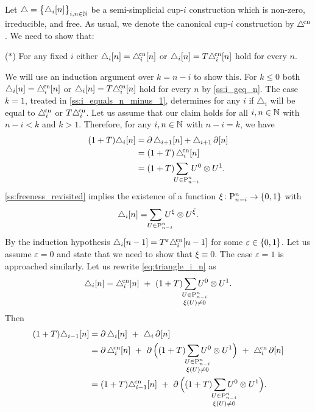 Let $\triangle = \set[\big]{\triangle_i [n]}_{i,n\in\N}$ be a semi-simplicial \mbox{cup-$i$} construction which is non-zero, irreducible, and free.
As usual, we denote the canonical \mbox{cup-$i$} construction by $\canonical$.
We need to show that:
\begin{center}
	($\ast$) For any fixed $i$ either $\triangle_i [n] = \canonical_ i [n]$ or $\triangle_i [n] = T\canonical_ i [n]$ hold for every $n$.
\end{center}
We will use an induction argument over $k = n-i$ to show this.
For $k \leq 0$ both $\triangle_i [n] = \canonical_ i [n]$ or $\triangle_i [n] = T\canonical_ i [n]$ hold for every $n$ by \cref{ss:i_geq_n}.
The case $k = 1$, treated in \cref{ss:i_equals_n_minus_1}, determines for any $i$ if $\triangle_i$ will be equal to $\canonical_i$ or $T\canonical_i$.
Let us assume that our claim holds for all $i,n \in \N$ with $n-i < k$ and $k > 1$.
Therefore, for any $i,n \in \N$ with $n-i = k$, we have
\begin{align*}
	(1+T)\triangle_i[n] &=
	\bd\triangle_{i+1}[n] + \triangle_{i+1}\bd[n] \\ &=
	(1+T)\,\canonical_i[n] \\ &=
	(1+T)\sum_{\mathclap{\quad U \in \P_{n-i}^n}} \, U^0 \ot U^1.
\end{align*}
\cref{ss:freeness_revisited} implies the existence of a function $\xi \colon \P_{n-i}^n \to \set{0,1}$ with
\begin{equation}\label{eq:triangle_i_n}
	\triangle_i[n] = \sum_{\mathclap{\quad U \in \P_{n-i}^n}} \, U^{\xi} \ot U^{\barxi}.
\end{equation}
By the induction hypothesis $\triangle_i[n-1] = T^\varepsilon\canonical_i[n-1]$ for some $\varepsilon \in \set{0,1}$.
Let us assume $\varepsilon = 0$ and state that we need to show that $\xi \equiv 0$.
The case $\varepsilon = 1$ is approached similarly.
Let us rewrite \cref{eq:triangle_i_n} as
\[
\triangle_i[n] = \canonical_i[n] \ +\
(1+T) \sum_{\quad\mathclap{\substack{U \in \P_{n-i}^n \\ \xi(U) \neq 0}}} U^0 \ot U^1.
\]
Then
\begin{equation}\label{eq:main proof a}
	\begin{split}
		(1+T)\triangle_{i-1}[n] &=
		\bd \triangle_{i}[n] \ +\ \triangle_{i}\bd[n] \\ &=
		\bd \canonical_{i}[n] \ + \
		\bd\Big((1+T)\sum_{\quad\mathclap{\substack{U \in \P_{n-i}^n \\ \xi(U) \neq 0}}} U^0 \ot U^1\Big)
		\ +\ \canonical_{i}\bd[n] \\ &=
		(1+T)\canonical_{i-1}[n] \ +\
		\bd\Big((1+T)\sum_{\quad\mathclap{\substack{U \in \P_{n-i}^n \\ \xi(U) \neq 0}}} U^0 \ot U^1\Big).
	\end{split}
\end{equation}
